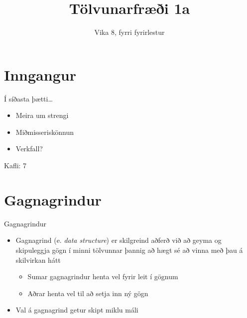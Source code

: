 \documentclass{beamer}
\title{Tölvunarfræði 1a}
\subtitle{Vika 8, fyrri fyrirlestur}
\begin{document}
\begin{frame}
\titlepage
\end{frame}

\section{Inngangur}

\begin{frame}{Í síðasta þætti\ldots}
\begin{itemize}
 \item Meira um strengi
 \item Miðmisseriskönnun
 \item Verkfall?
\end{itemize}
Kafli: 7 
\end{frame}

\section{Gagnagrindur}

\begin{frame}{Gagnagrindur}
\begin{itemize}
 \item Gagnagrind (e. \emph{data structure}) er skilgreind aðferð við að geyma og skipuleggja gögn í minni tölvunnar þannig að hægt sé að vinna með þau á skilvirkan hátt
 \begin{itemize}
  \item Sumar gagnagrindur henta vel fyrir leit í gögnum
  \item Aðrar henta vel til að setja inn ný gögn
 \end{itemize}
 \item Val á gagnagrind getur skipt miklu máli
\end{itemize}
\end{frame}
\end{document}
